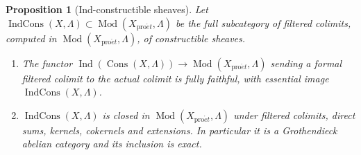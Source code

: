 \documentclass[11pt,a4paper]{article}
\numberwithin{equation}{section}
\newtheorem{proposition}[theorem]{Proposition}
\theoremstyle{definition}
\theoremstyle{remark}
\newcommand{\Mod}{\operatorname{Mod}}
\newcommand{\proet}{\mathrm{pro}\acute{e}t}
\newcommand{\Cons}{\operatorname{Cons}}
\newcommand{\IndCons}{\operatorname{IndCons}}
\begin{document}
\begin{proposition}[Ind-constructible sheaves]\label{b:prop:ind-heart}
Let $\IndCons(X,\Lambda)\subset\Mod(X_{\proet},\Lambda)$ be the full
subcategory of filtered colimits, computed in $\Mod(X_{\proet},\Lambda)$,
of constructible sheaves.
\begin{enumerate}
\item The functor $\operatorname{Ind}(\Cons(X,\Lambda))\to\Mod(X_{\proet},\Lambda)$
  sending a formal filtered colimit to the actual colimit is fully
  faithful, with essential image $\IndCons(X,\Lambda)$.
\item $\IndCons(X,\Lambda)$ is closed in $\Mod(X_{\proet},\Lambda)$ under
  filtered colimits, direct sums, kernels, cokernels and extensions. In
  particular it is a Grothendieck abelian category and its inclusion is
  exact.
\end{enumerate}
\end{proposition}
\end{document}
